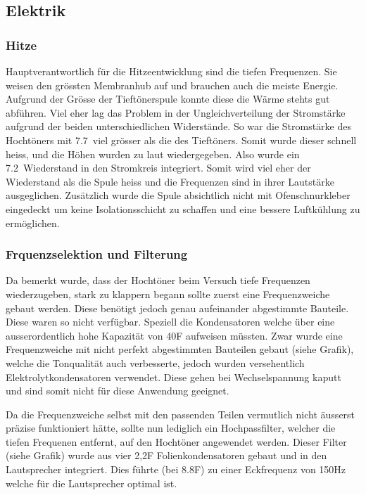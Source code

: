 \documentclass[a4paper,11pt]{report}
\begin{document}
\subsection{Elektrik}
\subsubsection*{Hitze}
Hauptverantwortlich für die Hitzeentwicklung sind die tiefen Frequenzen. Sie weisen den grössten Membranhub auf und brauchen auch die meiste Energie. Aufgrund der Grösse der Tieftönerspule konnte diese die Wärme stehts gut abführen. Viel eher lag das Problem in der Ungleichverteilung der Stromstärke aufgrund der beiden unterschiedlichen Widerstände. So war die Stromstärke des Hochtöners mit 7.7\Omega\ viel grösser als die des Tieftöners. Somit wurde dieser schnell heiss, und die Höhen wurden zu laut wiedergegeben. Also wurde ein 7.2\Omega\ Wiederstand in den Stromkreis integriert. Somit wird viel eher der Wiederstand als die Spule heiss und die Frequenzen sind in ihrer Lautstärke ausgeglichen. Zusätzlich wurde die Spule absichtlich nicht mit Ofenschnurkleber eingedeckt um keine Isolationsschicht zu schaffen und eine bessere Luftkühlung zu ermöglichen.
\subsubsection*{Frquenzselektion und Filterung}
Da bemerkt wurde, dass der Hochtöner beim Versuch tiefe Frequenzen wiederzugeben, stark zu klappern begann sollte zuerst eine Frequenzweiche gebaut werden. Diese benötigt jedoch genau aufeinander abgestimmte Bauteile. Diese waren so nicht verfügbar. Speziell die Kondensatoren welche über eine ausserordentlich hohe Kapazität von 40\mu F aufweisen müssten. Zwar wurde eine Frequenzweiche mit nicht perfekt abgestimmten Bauteilen gebaut (siehe Grafik), welche die Tonqualität auch verbesserte, jedoch wurden versehentlich Elektrolytkondensatoren verwendet. Diese gehen bei Wechselspannung kaputt und sind somit nicht für diese Anwendung geeignet. 

Da die Frequenzweiche selbst mit den passenden Teilen vermutlich nicht äusserst präzise funktioniert hätte, sollte nun lediglich ein Hochpassfilter, welcher die tiefen Frequenen entfernt, auf den Hochtöner angewendet werden. Dieser Filter (siehe Grafik) wurde aus vier 2,2\mu F Folienkondensatoren gebaut und in den Lautsprecher integriert. Dies führte (bei 8.8\mu F) zu einer Eckfrequenz von 150Hz welche für die Lautsprecher optimal ist. 
\end{document}
